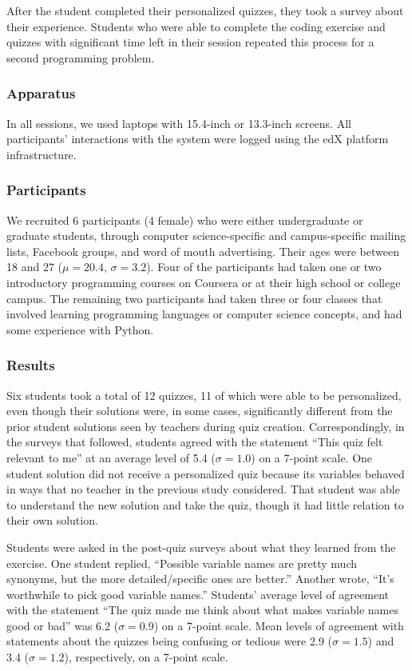 {{After the student completed their personalized quizzes, they took a survey about their experience. Students who were able to complete the coding exercise and quizzes with significant time left in their session repeated this process for a second programming problem.

\subsubsection{Apparatus}

In all sessions, we used laptops with 15.4-inch or 13.3-inch screens. All participants' interactions with the system were logged using the edX platform infrastructure.

\subsubsection{Participants}

We recruited 6 participants (4 female) who were either undergraduate or graduate students, through computer science-specific and campus-specific mailing lists, Facebook groups, and word of mouth advertising. Their ages were between 18 and 27 ($\mu=20.4$, $\sigma=3.2$). Four of the participants had taken one or two introductory programming courses on Coursera or at their high school or college campus. The remaining two participants had taken three or four classes that involved learning programming languages or computer science concepts, and had some experience with Python.

\subsubsection{Results}

Six students took a total of 12 quizzes, 11 of which were able to be personalized, even though their solutions were, in some cases, significantly different from the prior student solutions seen by teachers during quiz creation. Correspondingly, in the surveys that followed, students agreed with the statement ``This quiz felt relevant to me'' at an average level of 5.4 ($\sigma = 1.0$) on a 7-point scale. One student solution did not receive a personalized quiz because its variables behaved in ways that no teacher in the previous study considered. That student was able to understand the new solution and take the quiz, though it had little relation to their own solution.

Students were asked in the post-quiz surveys about what they learned from the exercise. One student replied, ``Possible variable names are pretty much synonyms, but the more detailed/specific ones are better.'' Another wrote, ``It's worthwhile to pick good variable names.'' Students' average level of agreement with the statement ``The quiz made me think about what makes variable names good or bad'' was 6.2 ($\sigma = 0.9$) on a 7-point scale. Mean levels of agreement with statements about the quizzes being confusing or tedious were 2.9 ($\sigma = 1.5$) and 3.4 ($\sigma = 1.2$), respectively, on a 7-point scale.

}}
